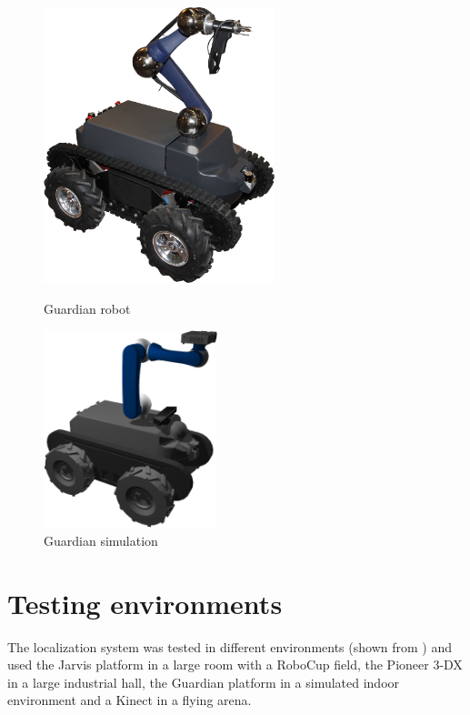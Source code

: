 \documentclass[9pt,a4paper]{extarticle}
\begin{document}
\begin{multicols}{2}
\begin{figure}[H]
	\centering
	\begin{minipage}[b]{0.2\textwidth}
		\centering
		\includegraphics[width=0.6\textwidth]{guardian}
		\caption{\small Guardian robot}
		\label{fig:guardian}
	\end{minipage}\hfill
	\begin{minipage}[b]{0.25\textwidth}
		\centering
		\includegraphics[width=0.45\textwidth]{guardian-gazebo}
		\caption{\small Guardian simulation}
		\label{fig:guardian-gazebo}
	\end{minipage}
\end{figure}


\section{Testing environments}

The localization system was tested in different environments (shown from ) and used the Jarvis platform in a large room with a RoboCup field, the Pioneer 3-DX in a large industrial hall, the Guardian platform in a simulated indoor environment and a Kinect in a flying arena.



\end{multicols}
\end{document}
